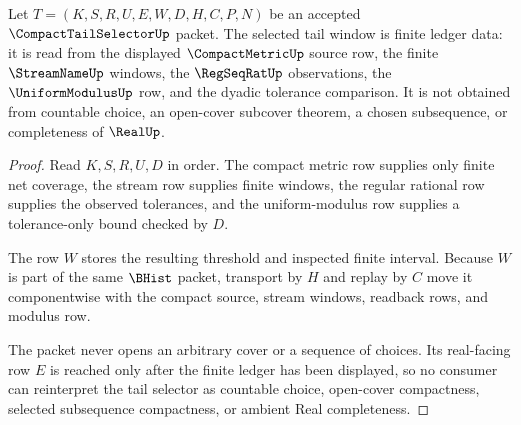 \begin{theorem}
\label{thm:compact-tail-selector-finite-ledger}
Let $T=(K,S,R,U,E,W,D,H,C,P,N)$ be an accepted $\CompactTailSelectorUp$ packet. The selected tail window is finite ledger data: it is read from the displayed $\CompactMetricUp$ source row, the finite $\StreamNameUp$ windows, the $\RegSeqRatUp$ observations, the $\UniformModulusUp$ row, and the dyadic tolerance comparison. It is not obtained from countable choice, an open-cover subcover theorem, a chosen subsequence, or completeness of $\RealUp$.
\end{theorem}
\begin{proof}
Read $K,S,R,U,D$ in order. The compact metric row supplies only finite net coverage, the stream row supplies finite windows, the regular rational row supplies the observed tolerances, and the uniform-modulus row supplies a tolerance-only bound checked by $D$.

The row $W$ stores the resulting threshold and inspected finite interval. Because $W$ is part of the same $\BHist$ packet, transport by $H$ and replay by $C$ move it componentwise with the compact source, stream windows, readback rows, and modulus row.

The packet never opens an arbitrary cover or a sequence of choices. Its real-facing row $E$ is reached only after the finite ledger has been displayed, so no consumer can reinterpret the tail selector as countable choice, open-cover compactness, selected subsequence compactness, or ambient Real completeness.
\end{proof}





